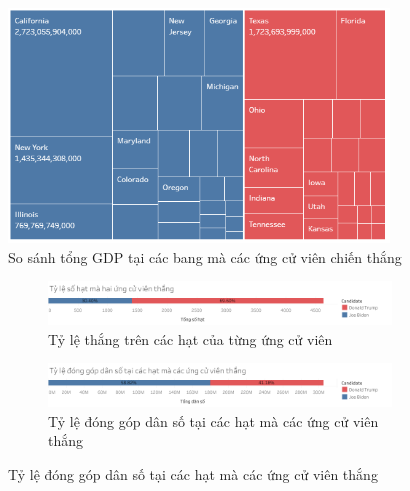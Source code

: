 \documentclass[10pt]{beamer}
\theoremstyle{remark}
\theoremstyle{definition}
\begin{document}
\begin{frame}
    \begin{figure}[h!]
        \centering
        \includegraphics[width=0.9\textwidth]{figures/State_GDP_Treemap.png}
        \caption{So sánh tổng GDP tại các bang mà các ứng cử viên chiến thắng}
    \end{figure}
\end{frame}

\begin{frame}
	\begin{figure}[h!]
        \begin{subfigure}[b]{\textwidth}
            \includegraphics[width=0.9\linewidth]{County_Total_Percentage_Candidate_Win.png}
            \caption{Tỷ lệ thắng trên các hạt của từng ứng cử viên}
        \end{subfigure}
        \vfill
        \begin{subfigure}[b]{\textwidth}
            \includegraphics[width=0.9\linewidth]{County_Percentage_Population_Candidate.png}
            \caption{Tỷ lệ đóng góp dân số tại các hạt mà các ứng cử viên thắng}
        \end{subfigure}
    \end{figure}
\end{frame}
\end{document}
